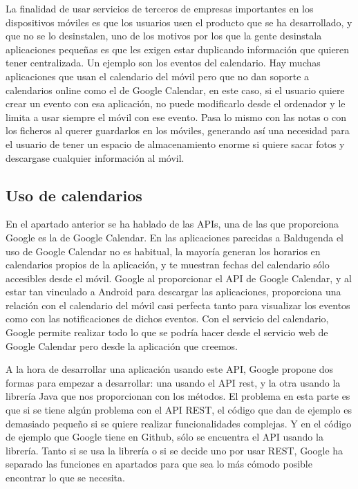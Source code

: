 La finalidad de usar servicios de terceros de empresas importantes en los dispositivos móviles es que los usuarios usen el producto que se ha desarrollado, y que no se lo desinstalen, uno de los motivos por los que la gente desinstala aplicaciones pequeñas es que les exigen estar duplicando información que quieren tener centralizada. Un ejemplo son los eventos del calendario. Hay muchas aplicaciones que usan el calendario del móvil pero que no dan soporte a calendarios online como el de Google Calendar, en este caso, si el usuario quiere crear un evento con esa aplicación, no puede modificarlo desde el ordenador y le limita a usar siempre el móvil con ese evento.
Pasa lo mismo con las notas o con los ficheros al querer guardarlos en los móviles, generando así una necesidad para el usuario de tener un espacio de almacenamiento enorme si quiere sacar fotos y descargase cualquier información al móvil.

\subsection{Uso de calendarios}
\label{subsecc:Uso de calendarios}

En el apartado anterior se ha hablado de las APIs,  una de las que proporciona Google es la de Google Calendar. En las aplicaciones parecidas a Baldugenda el uso de Google Calendar no es habitual, la mayoría generan los horarios en calendarios propios de la aplicación, y te muestran fechas del calendario sólo accesibles desde el móvil.
Google al proporcionar el API de Google Calendar, y al estar tan vinculado a Android para descargar las aplicaciones, proporciona una relación con el calendario del móvil casi perfecta tanto para visualizar los eventos como con las notificaciones de dichos eventos.
Con el servicio del calendario, Google permite realizar todo lo que se podría hacer desde el servicio web de Google Calendar pero desde la aplicación que creemos.

A la hora de desarrollar una aplicación usando este API, Google propone dos formas para empezar a desarrollar: una usando el API \acrshort{rest}, y la otra usando la librería Java que nos proporcionan con los métodos.
El problema en esta parte es que si se tiene algún problema con el API REST, el código que dan de ejemplo es demasiado pequeño si se quiere realizar funcionalidades complejas. Y en el código de ejemplo que Google tiene en \gls{Github}, sólo se encuentra el API usando la librería.
Tanto si se usa la librería o si se decide uno por usar REST, Google ha separado las funciones en apartados para que sea lo más cómodo posible encontrar lo que se necesita.

